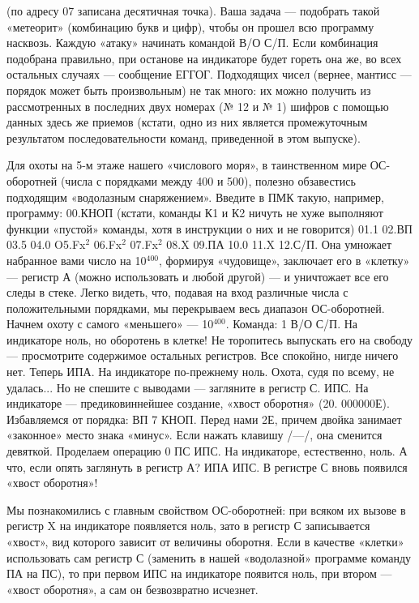 \documentclass[11pt,a4paper,oneside]{article}
\begin{document}
(по адресу 07 записана десятичная точка). Ваша задача — подобрать такой «метеорит» (комбинацию букв и цифр), чтобы он прошел всю программу насквозь. Каждую «атаку» начинать командой В/О С/П. Если комбинация подобрана правильно, при останове на индикаторе будет гореть она же, во всех остальных случаях — сообщение ЕГГОГ. Подходящих чисел (вернее, мантисс — порядок может быть произвольным) не так много: их можно получить из рассмотренных в последних двух номерах (№ 12 и № 1) шифров с помощью данных здесь же приемов (кстати, одно из них является промежуточным результатом последовательности команд, приведенной в этом выпуске).

Для охоты на 5-м этаже нашего «числового моря», в таинственном мире ОС-оборотней (числа с порядками между 400 и 500), полезно обзавестись подходящим «водолазным снаряжением». Введите в ПМК такую, например, программу: 00.КНОП (кстати, команды К1 и К2 ничуть не хуже выполняют функции «пустой» команды, хотя в инструкции о них и не говорится) 01.1 02.ВП 03.5 04.0 O5.Fx$^{2}$ 06.Fx$^{2}$ 07.Fx$^{2}$ 08.X 09.ПА 10.0 11.X 12.С/П. Она умножает набранное вами число на 10$^{400}$, формируя «чудовище», заключает его в «клетку» — регистр А (можно использовать и любой другой) — и уничтожает все его следы в стеке. Легко видеть, что, подавая на вход различные числа с положительными порядками, мы перекрываем весь диапазон ОС-оборотней. Начнем охоту с самого «меньшего» — 10$^{400}$. Команда: 1 В/О С/П. На индикаторе ноль, но оборотень в клетке! Не торопитесь выпускать его на свободу — просмотрите содержимое остальных регистров. Все спокойно, нигде ничего нет. Теперь ИПА. На индикаторе по-прежнему ноль. Охота, судя по всему, не удалась... Но не спешите с выводами — загляните в регистр С. ИПС. На индикаторе — предиковиннейшее создание, «хвост оборотня» (20. 000000Е). Избавляемся от порядка: ВП 7 КНОП. Перед нами 2Е, причем двойка занимает «законное» место знака «минус». Если нажать клавишу /—/, она сменится девяткой. Проделаем операцию 0 ПС ИПС. На индикаторе, естественно, ноль. А что, если опять заглянуть в регистр А? ИПА ИПС. В регистре С вновь появился «хвост оборотня»!

Мы познакомились с главным свойством ОС-оборотней: при всяком их вызове в регистр X на индикаторе появляется ноль, зато в регистр С записывается «хвост», вид которого зависит от величины оборотня. Если в качестве «клетки» использовать сам регистр С (заменить в нашей «водолазной» программе команду ПА на ПС), то при первом ИПС на индикаторе появится ноль, при втором — «хвост оборотня», а сам он безвозвратно исчезнет.
\end{document}
